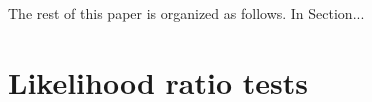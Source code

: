 \documentclass[12pt]{article}
\numberwithin{equation}{section}
\theoremstyle{plain}
\begin{document}
%

The rest of this paper is organized as follows. In Section...

\section{Likelihood ratio tests}
\label{sec:likelihood-ratio-tests}

%
\end{document}
